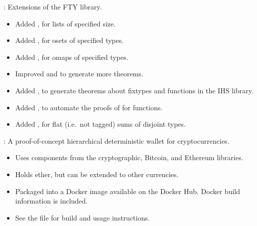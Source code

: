 \begin{frame}

\implibtitle

:
Extensions of the FTY library.
\begin{itemize}
\item
Added , for lists of specified size.
\item
Added , for osets of specified types.
\item
Added , for omaps of specified types.
\item
Improved  and  to generate more theorems.
\item
Added ,
to generate theorems about  fixtypes
and functions in the IHS library.
\item
Added ,
to automate the proofs of  for  functions.
\item
Added ,
for flat (i.e.\ not tagged) sums of disjoint types.
\end{itemize}

\end{frame}


\begin{frame}

\implibtitle

:
A proof-of-concept hierarchical deterministic wallet for cryptocurrencies.
\begin{itemize}
\item
Uses components from the cryptographic, Bitcoin, and Ethereum libraries.
\item
Holds ether, but can be extended to other currencies.
\item
Packaged into a Docker image available on the Docker Hub.
Docker build information is included.
\item
See the file 
for build and usage instructions.
\end{itemize}

\end{frame}


